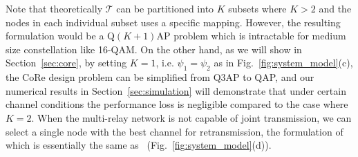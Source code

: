 \documentclass[conference]{IEEEtran}
\begin{document}
Note that theoretically $\mathcal{T}$ can be partitioned into $K$ subsets where
$K>2$ and the nodes in each individual subset uses a specific mapping.
However, the resulting formulation would be a Q$(K+1)$AP problem which is
intractable for medium size constellation like 16-QAM. On the other hand, as we
will show in Section~\ref{sec:core}, by setting $K = 1$, i.e. $\psi_1 =
\psi_2$ as in Fig.~\ref{fig:system_model}(c), the CoRe design problem can be
simplified from Q3AP to QAP, and our numerical results in
Section~\ref{sec:simulation} will demonstrate that under certain channel
conditions the performance loss is negligible compared to the case where $K =
2$. When the multi-relay network is not capable of joint transmission, we can
select a single node with the best channel for retransmission, the formulation
of which is essentially the same as~\cite{} (Fig.~\ref{fig:system_model}(d)).
%
%



%
%
\end{document}
